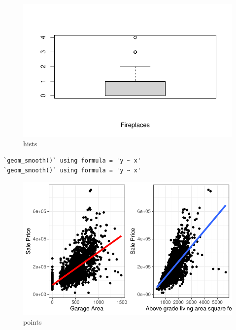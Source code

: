 \documentclass[
  letterpaper,
  DIV=11,
  numbers=noendperiod]{scrartcl}
\begin{document}
\begin{figure}[H]

{\centering \includegraphics{paper_files/figure-pdf/histbox-5.pdf}

}

\caption{hists}

\end{figure}%

\begin{verbatim}
`geom_smooth()` using formula = 'y ~ x'
`geom_smooth()` using formula = 'y ~ x'
\end{verbatim}

\begin{figure}[H]

{\centering \includegraphics{paper_files/figure-pdf/point-1.pdf}

}

\caption{points}

\end{figure}%
\end{document}
